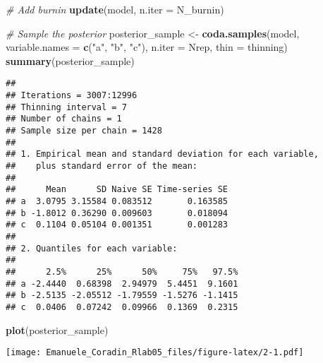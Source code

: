 \documentclass[
]{article}
\newenvironment{Shaded}{\begin{snugshade}}{\end{snugshade}}
\newcommand{\AttributeTok}[1]{\textcolor[rgb]{0.13,0.29,0.53}{#1}}
\newcommand{\CommentTok}[1]{\textcolor[rgb]{0.56,0.35,0.01}{\textit{#1}}}
\newcommand{\FunctionTok}[1]{\textcolor[rgb]{0.13,0.29,0.53}{\textbf{#1}}}
\newcommand{\NormalTok}[1]{#1}
\newcommand{\OtherTok}[1]{\textcolor[rgb]{0.56,0.35,0.01}{#1}}
\newcommand{\StringTok}[1]{\textcolor[rgb]{0.31,0.60,0.02}{#1}}
\begin{document}
\begin{Shaded}
\begin{Highlighting}[]
\CommentTok{\# Add burnin}
\FunctionTok{update}\NormalTok{(model, }\AttributeTok{n.iter =}\NormalTok{ N\_burnin)}

\CommentTok{\# Sample the posterior}
\NormalTok{posterior\_sample }\OtherTok{\textless{}{-}} \FunctionTok{coda.samples}\NormalTok{(model,}
                       \AttributeTok{variable.names =} \FunctionTok{c}\NormalTok{(}\StringTok{"a"}\NormalTok{, }\StringTok{"b"}\NormalTok{, }\StringTok{"c"}\NormalTok{),}
                       \AttributeTok{n.iter =}\NormalTok{ Nrep, }\AttributeTok{thin =}\NormalTok{ thinning)}
\FunctionTok{summary}\NormalTok{(posterior\_sample)}
\end{Highlighting}
\end{Shaded}

\begin{verbatim}
## 
## Iterations = 3007:12996
## Thinning interval = 7 
## Number of chains = 1 
## Sample size per chain = 1428 
## 
## 1. Empirical mean and standard deviation for each variable,
##    plus standard error of the mean:
## 
##      Mean      SD Naive SE Time-series SE
## a  3.0795 3.15584 0.083512       0.163585
## b -1.8012 0.36290 0.009603       0.018094
## c  0.1104 0.05104 0.001351       0.001283
## 
## 2. Quantiles for each variable:
## 
##      2.5%      25%      50%     75%   97.5%
## a -2.4440  0.68398  2.94979  5.4451  9.1601
## b -2.5135 -2.05512 -1.79559 -1.5276 -1.1415
## c  0.0406  0.07242  0.09966  0.1369  0.2315
\end{verbatim}

\begin{Shaded}
\begin{Highlighting}[]
\FunctionTok{plot}\NormalTok{(posterior\_sample)}
\end{Highlighting}
\end{Shaded}

\texttt{[image: Emanuele\_Coradin\_Rlab05\_files/figure-latex/2-1.pdf]}
\end{document}
